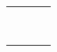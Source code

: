 \documentclass[11pt]{article} %
\begin{document}
\begin{table}[]
\begin{tabular}{@{}llll@{}}
          &              &                    &                                                                                                         \\
          &              &                    &                                                                                                         \\
          &              &                    &                                                                                                         \\
          &              &                    &                                                                                                         \\
          &              &                    &                                                                                                         \\
          &              &                    &                                                                                                         \\
          &              &                    &                                                                                                         \\
          &              &                    &                                                                                                         \\
          &              &                    &                                                                                                        
\end{tabular}
\end{table}
\end{document}
